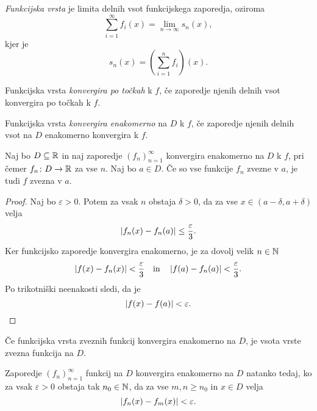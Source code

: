 \documentclass[12pt, a4paper]{article}
\begin{document}
\begin{definicija}
\emph{Funkcijska vrsta} je limita delnih vsot funkcijskega zaporedja, oziroma
\[
\sum_{i=1}^\infty f_i(x)=\lim_{n\to\infty} s_n(x),
\]
kjer je
\[
s_n(x)=\left(\sum_{i=1}^n f_i\right)(x).
\]
\end{definicija}

\begin{definicija}
Funkcijska vrsta \emph{konvergira po točkah} k $f$, če zaporedje njenih delnih vsot konvergira po točkah k $f$.
\end{definicija}

\begin{definicija}
Funkcijska vrsta \emph{konvergira enakomerno} na $D$ k $f$, če zaporedje njenih delnih vsot na $D$ enakomerno konvergira k $f$.
\end{definicija}

\begin{izrek}
Naj bo $D\subseteq\mathbb{R}$ in naj zaporedje $(f_n)_{n=1}^\infty$ konvergira enakomerno na $D$ k $f$, pri čemer $f_n\colon D\to\mathbb{R}$ za vse $n$. Naj bo $a\in D$. Če so vse funkcije $f_n$ zvezne v $a$, je tudi $f$ zvezna v $a$.
\end{izrek}

\begin{proof}
Naj bo $\varepsilon>0$. Potem za vsak $n$ obstaja $\delta>0$, da za vse $x\in(a-\delta,a+\delta)$ velja
\[
\left\lvert f_n(x)-f_n(a)\right\rvert\leq \frac{\varepsilon}{3}.
\]
Ker funkcijsko zaporedje konvergira enakomerno, je za dovolj velik $n\in\mathbb{N}$
\[
\left\lvert f(x)-f_n(x)\right\rvert<\frac{\varepsilon}{3}\quad\text{in}\quad\left\lvert f(a)-f_n(a)\right\rvert<\frac{\varepsilon}{3}.
\]
Po trikotniški neenakosti sledi, da je
\[
\left\lvert f(x)-f(a)\right\rvert<\varepsilon.\qedhere
\]
\end{proof}

\begin{posledica}
Če funkcijska vrsta zveznih funkcij konvergira enakomerno na $D$, je vsota vrste zvezna funkcija na $D$.
\end{posledica}

\begin{izrek}
Zaporedje $(f_n)_{n=1}^\infty$ funkcij na $D$ konvergira enakomerno na $D$ natanko tedaj, ko za vsak $\varepsilon>0$ obstaja tak $n_0\in\mathbb{N}$, da za vse $m,n\geq n_0$ in $x\in D$ velja
\[
\left\lvert f_n(x)-f_m(x)\right\rvert<\varepsilon.
\]
\end{izrek}
\end{document}
